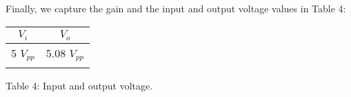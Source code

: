 Finally, we capture the gain and the input and output voltage values in Table 4: \hfill \break

\begin{center}
\begin{tabular}[.5cm]{c c}
\toprule
\toprule
\hspace{85pt} $V_{i}$ \hspace{85pt} & \hspace{85pt} $V_{o}$ \hspace{85pt} \\
\midrule
\midrule
5 $V_{pp}$ & 5.08 $V_{pp}$ \\
\bottomrule
\linebreak
\end{tabular}
\linebreak Table 4: Input and output voltage.
\end{center}

\pagebreak